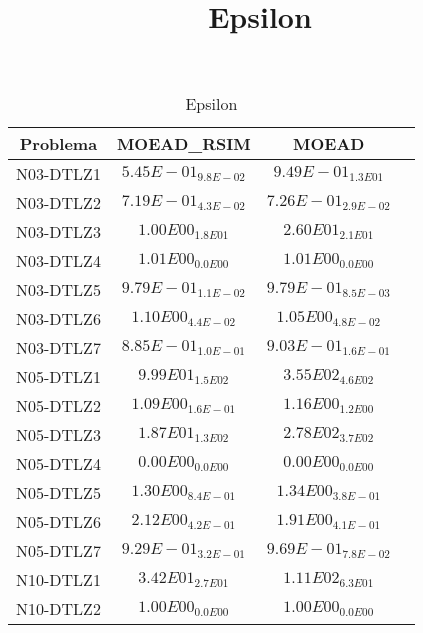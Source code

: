 \documentclass{article}
\title{Epsilon}
\author{}
\begin{document}
\maketitle
\begin{table*}[ht!]
\scriptsize
\caption{Epsilon}
\centering\begin{tabular}{|c||c||c||c|} \hline
Problema &MOEAD_RSIM &MOEAD\\\hline
N03-DTLZ1 &\cellcolor{gray95}$5.45E-01_{9.8E-02}$ &\cellcolor{gray25}$9.49E-01_{1.3E01}$\\ 
\hline
N03-DTLZ2 &\cellcolor{gray95}$7.19E-01_{4.3E-02}$ &\cellcolor{gray25}$7.26E-01_{2.9E-02}$\\ 
\hline
N03-DTLZ3 &\cellcolor{gray95}$1.00E00_{1.8E01}$ &\cellcolor{gray25}$2.60E01_{2.1E01}$\\ 
\hline
N03-DTLZ4 &\cellcolor{gray95}$1.01E00_{0.0E00}$ &\cellcolor{gray25}$1.01E00_{0.0E00}$\\ 
\hline
N03-DTLZ5 &\cellcolor{gray25}$9.79E-01_{1.1E-02}$ &\cellcolor{gray95}$9.79E-01_{8.5E-03}$\\ 
\hline
N03-DTLZ6 &\cellcolor{gray25}$1.10E00_{4.4E-02}$ &\cellcolor{gray95}$1.05E00_{4.8E-02}$\\ 
\hline
N03-DTLZ7 &\cellcolor{gray95}$8.85E-01_{1.0E-01}$ &\cellcolor{gray25}$9.03E-01_{1.6E-01}$\\ 
\hline
N05-DTLZ1 &\cellcolor{gray95}$9.99E01_{1.5E02}$ &\cellcolor{gray25}$3.55E02_{4.6E02}$\\ 
\hline
N05-DTLZ2 &\cellcolor{gray95}$1.09E00_{1.6E-01}$ &\cellcolor{gray25}$1.16E00_{1.2E00}$\\ 
\hline
N05-DTLZ3 &\cellcolor{gray95}$1.87E01_{1.3E02}$ &\cellcolor{gray25}$2.78E02_{3.7E02}$\\ 
\hline
N05-DTLZ4 &\cellcolor{gray95}$0.00E00_{0.0E00}$ &\cellcolor{gray25}$0.00E00_{0.0E00}$\\ 
\hline
N05-DTLZ5 &\cellcolor{gray95}$1.30E00_{8.4E-01}$ &\cellcolor{gray25}$1.34E00_{3.8E-01}$\\ 
\hline
N05-DTLZ6 &\cellcolor{gray25}$2.12E00_{4.2E-01}$ &\cellcolor{gray95}$1.91E00_{4.1E-01}$\\ 
\hline
N05-DTLZ7 &\cellcolor{gray95}$9.29E-01_{3.2E-01}$ &\cellcolor{gray25}$9.69E-01_{7.8E-02}$\\ 
\hline
N10-DTLZ1 &\cellcolor{gray95}$3.42E01_{2.7E01}$ &\cellcolor{gray25}$1.11E02_{6.3E01}$\\ 
\hline
N10-DTLZ2 &\cellcolor{gray95}$1.00E00_{0.0E00}$ &\cellcolor{gray25}$1.00E00_{0.0E00}$\\ 

\end{tabular}
\end{table*}
\end{document}
